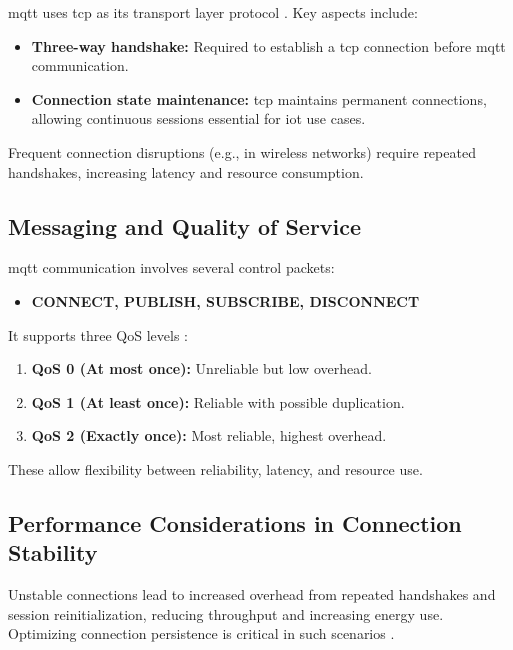 \documentclass[12pt, english, openany]{book}
\begin{document}
\gls{mqtt} uses \gls{tcp} as its transport layer protocol \parencite{naik2017choice}. Key aspects include:

\begin{itemize}
    \item \textbf{Three-way handshake:} Required to establish a \gls{tcp} connection before \gls{mqtt} communication.
    \item \textbf{Connection state maintenance:} \gls{tcp} maintains permanent connections, allowing continuous sessions essential for \gls{iot} use cases.
\end{itemize}

Frequent connection disruptions (e.g., in wireless networks) require repeated handshakes, increasing latency and resource consumption.

\subsection{Messaging and Quality of Service}

\gls{mqtt} communication involves several control packets:

\begin{itemize}
    \item \textbf{CONNECT, PUBLISH, SUBSCRIBE, DISCONNECT}
\end{itemize}

It supports three QoS levels \parencite{MQTT_WIKI}:

\begin{enumerate}
    \item \textbf{QoS 0 (At most once):} Unreliable but low overhead.
    \item \textbf{QoS 1 (At least once):} Reliable with possible duplication.
    \item \textbf{QoS 2 (Exactly once):} Most reliable, highest overhead.
\end{enumerate}

These allow flexibility between reliability, latency, and resource use.

\subsection{Performance Considerations in Connection Stability}

Unstable connections lead to increased overhead from repeated handshakes and session reinitialization, reducing throughput and increasing energy use. Optimizing connection persistence is critical in such scenarios \parencite{naik2017choice}.
\end{document}
